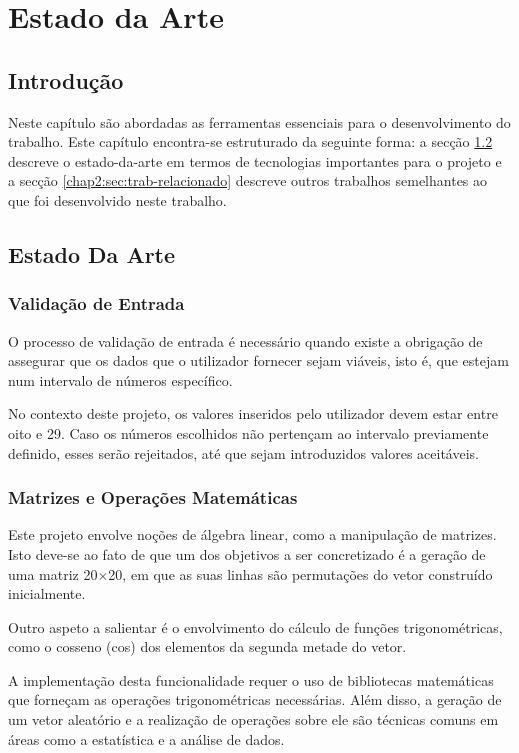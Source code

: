 \chapter{Estado da Arte}
\label{chap:estado-da-arte}

\section{Introdução}
\label{chap2:sec:intro}
Neste capítulo são abordadas as ferramentas essenciais para o desenvolvimento do trabalho. Este capítulo encontra-se estruturado da seguinte forma: a secção \ref{chap2:sec:estado} descreve o estado-da-arte em termos de tecnologias importantes para o projeto e a secção \ref{chap2:sec:trab-relacionado} descreve outros trabalhos semelhantes ao que foi desenvolvido neste trabalho.

\section{Estado Da Arte}
\label{chap2:sec:estado}

\subsection{Validação de Entrada}
\label{chap2:subsec:validacao-entrada}

O processo de validação de entrada é necessário quando existe a obrigação de assegurar que os dados que o utilizador fornecer sejam viáveis, isto é, que estejam num intervalo de números específico. 
\par No contexto deste projeto, os valores inseridos pelo utilizador devem estar entre oito e 29. Caso os números escolhidos não pertençam ao intervalo previamente definido, esses serão rejeitados, até que sejam introduzidos valores aceitáveis.

\newpage

\subsection{Matrizes e Operações Matemáticas}
\label{chap2:subsec:matrizes-operacoes}
Este projeto envolve noções de álgebra linear, como a manipulação de matrizes.
Isto deve-se ao fato de que um dos objetivos a ser concretizado é a geração de uma matriz 20×20, em que as suas linhas são permutações do vetor construído inicialmente. \par
Outro aspeto a salientar é o envolvimento do cálculo de funções trigonométricas, como o cosseno (cos) dos elementos da segunda metade do vetor. \par
A implementação desta funcionalidade requer o uso de bibliotecas matemáticas que forneçam as operações trigonométricas necessárias. 
Além disso, a geração de um vetor aleatório e a realização de operações sobre ele são técnicas comuns em áreas como a estatística e a análise de dados.

